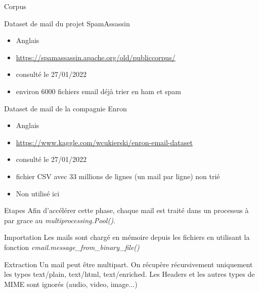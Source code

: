\documentclass[xelatex,11pt, xcolor=dvipsnames]{beamer}
\begin{document}
\begin{frame}{Corpus}
	\begin{block}{Dataset de mail du projet SpamAssassin}
		\begin{itemize}
			\item Anglais
			\item \url{https://spamassassin.apache.org/old/publiccorpus/}
			\item consulté le 27/01/2022
			\item environ 6000 fichiers email déjà trier en ham et spam
		\end{itemize}
	\end{block}
	
	\begin{block}{Dataset de mail de la compagnie Enron}
		\begin{itemize}
			\item Anglais
			\item \url{https://www.kaggle.com/wcukierski/enron-email-dataset}
			\item consulté le 27/01/2022
			\item fichier CSV avec 33 millions de lignes (un mail par ligne) non trié
			\item Non utilisé ici
		\end{itemize}
	\end{block}
\end{frame}


\begin{frame}{Etapes}
	Afin d'accélérer cette phase, chaque mail est traité dans un processus à par grace au \emph{multiprocessing.Pool()}.
	\begin{block}{Importation}
		Les mails sont chargé en mémoire depuis les fichiers en utilisant la fonction \emph{email.message\_from\_binary\_file()}
	\end{block}

	\begin{block}{Extraction}
		Un mail peut être multipart.
		On récupère récursivement uniquement les types text/plain, text/html, text/enriched.
		Les Headers et les autres types de MIME sont ignorés (audio, video, image...)
	\end{block}
\end{frame}
\end{document}
